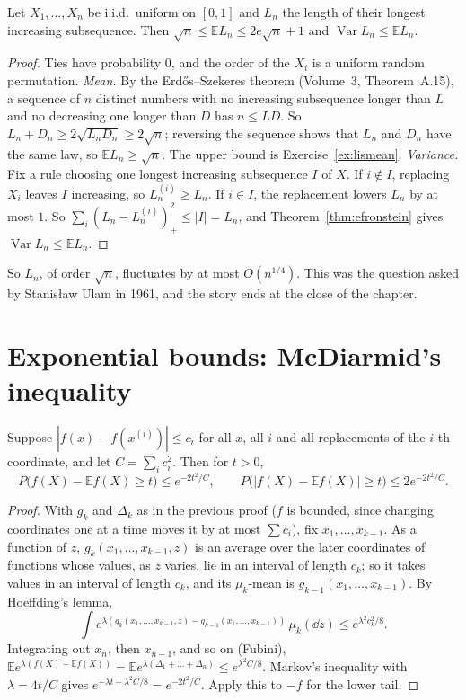 \begin{proposition}\label{prop:lisvar}
Let $X_1,\dots,X_n$ be i.i.d.\ uniform on $[0,1]$ and $L_n$ the length of their longest increasing subsequence. Then $\sqrt n\le\mathbb EL_n\le2e\sqrt n+1$ and
$\operatorname{Var}L_n\le\mathbb EL_n$.
\end{proposition}
\begin{proof}
Ties have probability $0$, and the order of the $X_i$ is a uniform random permutation. \emph{Mean.} By the Erd\H os--Szekeres theorem (Volume~3, Theorem~A.15), a sequence of
$n$ distinct numbers with no increasing subsequence longer than $L$ and no decreasing one longer than $D$ has $n\le LD$. So $L_n+D_n\ge2\sqrt{L_nD_n}\ge2\sqrt n$; reversing
the sequence shows that $L_n$ and $D_n$ have the same law, so $\mathbb EL_n\ge\sqrt n$. The upper bound is Exercise~\ref{ex:lismean}.
\emph{Variance.} Fix a rule choosing one longest increasing subsequence $I$ of $X$. If $i\notin I$, replacing $X_i$ leaves $I$ increasing, so $L_n^{(i)}\ge L_n$. If $i\in I$, the
replacement lowers $L_n$ by at most $1$. So $\sum_i(L_n-L_n^{(i)})_+^2\le|I|=L_n$, and Theorem~\ref{thm:efronstein} gives $\operatorname{Var}L_n\le\mathbb EL_n$.
\end{proof}

So $L_n$, of order $\sqrt n$, fluctuates by at most $O(n^{1/4})$. This was the question asked by Stanis\l aw Ulam in 1961, and the story ends at the close of
the chapter.

\section{Exponential bounds: McDiarmid's inequality}

\begin{theorem}[McDiarmid]\label{thm:mcdiarmid}
Suppose $|f(x)-f(x^{(i)})|\le c_i$ for all $x$, all $i$ and all replacements of the $i$-th coordinate, and let $C=\sum_ic_i^2$. Then for $t>0$,
\[
P\bigl(f(X)-\mathbb Ef(X)\ge t\bigr)\le e^{-2t^2/C},\qquad P\bigl(|f(X)-\mathbb Ef(X)|\ge t\bigr)\le2e^{-2t^2/C}.
\]
\end{theorem}
\begin{proof}
With $g_k$ and $\Delta_k$ as in the previous proof ($f$ is bounded, since changing coordinates one at a time moves it by at most $\sum c_i$), fix $x_1,\dots,x_{k-1}$. As a
function of $z$, $g_k(x_1,\dots,x_{k-1},z)$ is an average over the later coordinates of functions whose values, as $z$ varies, lie in an interval of length $c_k$; so it
takes values in an interval of length $c_k$, and its $\mu_k$-mean is $g_{k-1}(x_1,\dots,x_{k-1})$. By Hoeffding's lemma,
\[
\int e^{\lambda(g_k(x_1,\dots,x_{k-1},z)-g_{k-1}(x_1,\dots,x_{k-1}))}\,\mu_k(\dd z)\le e^{\lambda^2c_k^2/8}.
\]
Integrating out $x_n$, then $x_{n-1}$, and so on (Fubini), $\mathbb Ee^{\lambda(f(X)-\mathbb Ef(X))}=\mathbb Ee^{\lambda(\Delta_1+\dots+\Delta_n)}\le e^{\lambda^2C/8}$. Markov's inequality with
$\lambda=4t/C$ gives $e^{-\lambda t+\lambda^2C/8}=e^{-2t^2/C}$. Apply this to $-f$ for the lower tail.
\end{proof}

